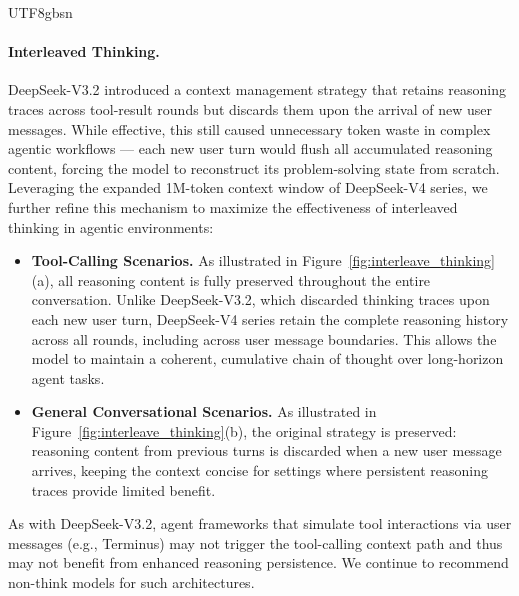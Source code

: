 \documentclass[11pt, a4paper, logo, copyright, nonumbering]{deepseek}
\newcommand{\dsviiiII}{DeepSeek-V3.2}
\newcommand{\dsviv}{DeepSeek-V4}
\begin{document}
\begin{CJK*}{UTF8}{gbsn}
\paragraph{Interleaved Thinking.}
\dsviiiII{} introduced a context management strategy that retains reasoning traces across tool-result rounds but discards them upon the arrival of new user messages. 
While effective, this still caused unnecessary token waste in complex agentic workflows --- each new user turn would flush all accumulated reasoning content, forcing the model to reconstruct its problem-solving state from scratch.
Leveraging the expanded 1M-token context window of \dsviv{} series, we further refine this mechanism to maximize the effectiveness of interleaved thinking in agentic environments:
\begin{itemize}
    \item \textbf{Tool-Calling Scenarios.} 
    As illustrated in Figure~\ref{fig:interleave_thinking}(a), all reasoning content is fully preserved throughout the entire conversation. 
    Unlike \dsviiiII{}, which discarded thinking traces upon each new user turn, \dsviv{} series retain the complete reasoning history across all rounds, including across user message boundaries. 
    This allows the model to maintain a coherent, cumulative chain of thought over long-horizon agent tasks.
    \item \textbf{General Conversational Scenarios.} 
    As illustrated in Figure~\ref{fig:interleave_thinking}(b), the original strategy is preserved: reasoning content from previous turns is discarded when a new user message arrives, keeping the context concise for settings where persistent reasoning traces provide limited benefit.
\end{itemize}
As with \dsviiiII{}, agent frameworks that simulate tool interactions via user messages (e.g., Terminus) may not trigger the tool-calling context path and thus may not benefit from enhanced reasoning persistence. 
We continue to recommend non-think models for such architectures.


\end{CJK*}
\end{document}
